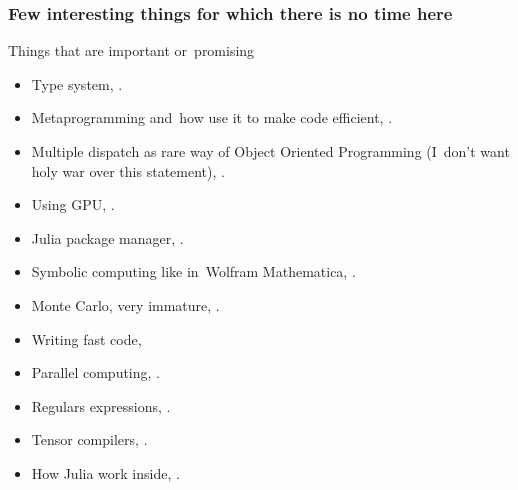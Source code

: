 \documentclass{beamer}  %
\begin{document}
\begin{frame}
  \frametitle{Few interesting things for which there is no time here}

  \begin{block}{Things that are important or~promising}
    \begin{itemize}
    \item Type system,
      .
    \item Metaprogramming and~how use it to make code efficient,
      .
    \item Multiple dispatch as rare way of Object Oriented Programming
      (I~don't want holy war over this statement),
      .
    \item Using GPU,
      .
    \item Julia package manager,
      .
    \item Symbolic computing like in~Wolfram Mathematica,
      .
    \item Monte Carlo, very immature,
      .
    \item Writing fast code,
    \item Parallel computing,
      .
    \item Regulars expressions,
      .
    \item Tensor compilers,
      .
    \item How Julia work inside,
      .
    \end{itemize}
  \end{block}
  
\end{frame}





\end{document}
